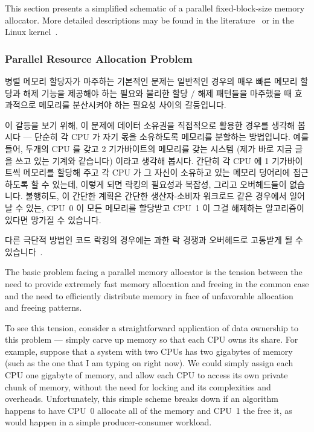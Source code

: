 This section presents a simplified schematic of a parallel fixed-block-size
memory allocator.
More detailed descriptions may be found in the
literature~\cite{McKenney92a,McKenney93,Bonwick01slab,McKenney01e}
or in the Linux kernel~\cite{Torvalds2.6kernel}.
\fi

\subsubsection{Parallel Resource Allocation Problem}

병렬 메모리 할당자가 마주하는 기본적인 문제는 일반적인 경우의 매우 빠른 메모리
할당과 해제 기능을 제공해야 하는 필요와 불리한 할당 / 해제 패턴들을 마주했을 때
효과적으로 메모리를 분산시켜야 하는 필요성 사이의 갈등입니다.

이 갈등을 보기 위해, 이 문제에 데이터 소유권을 직접적으로 활용한 경우를 생각해
봅시다 --- 단순히 각 CPU 가 자기 몫을 소유하도록 메모리를 분할하는 방법입니다.
예를 들어, 두개의 CPU 를 갖고 2 기가바이트의 메모리를 갖는 시스템 (제가 바로
지금 글을 쓰고 있는 기계와 같습니다) 이라고 생각해 봅시다.
간단히 각 CPU 에 1 기가바이트씩 메모리를 할당해 주고 각 CPU 가 그 자신이
소유하고 있는 메모리 덩어리에 접근하도록 할 수 있는데, 이렇게 되면 락킹의
필요성과 복잡성, 그리고 오버헤드들이 없습니다.
불행히도, 이 간단한 계획은 간단한 생산자-소비자 워크로드 같은 경우에서 일어날
수 있는, CPU~0 이 모든 메모리를 할당받고 CPU~1 이 그걸 해제하는 알고리즘이
있다면 망가질 수 있습니다.

다른 극단적 방법인 코드 락킹의 경우에는 과한 락 경쟁과 오버헤드로 고통받게 될
수 있습니다~\cite{McKenney93}.
\iffalse

The basic problem facing a parallel memory allocator is the tension
between the need to provide extremely fast memory allocation and
freeing in the common case and the need to efficiently distribute
memory in face of unfavorable allocation and freeing patterns.

To see this tension, consider a straightforward application of
data ownership to this problem --- simply carve up memory so that
each CPU owns its share.
For example, suppose that a system with two CPUs has two gigabytes
of memory (such as the one that I am typing on right now).
We could simply assign each CPU one gigabyte of memory, and allow
each CPU to access its own private chunk of memory, without the
need for locking and its complexities and overheads.
Unfortunately, this simple scheme breaks down if an algorithm happens
to have CPU~0 allocate all of the memory and CPU~1 the free it, as
would happen in a simple producer-consumer workload.

